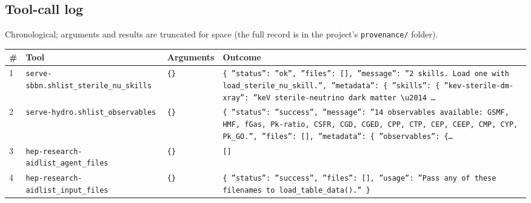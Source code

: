\documentclass[11pt,a4paper]{article}
\begin{document}
\subsection{Tool-call log}
Chronological; arguments and results are truncated for space (the full record is in the project's \texttt{provenance/} folder).
\begin{longtable}{@{}p{}p{}p{}p{}@{}}
\toprule \# & Tool & Arguments & Outcome \\ \midrule \endhead
1 & \texttt{serve-sbbn.sh}\newline\texttt{list\_\allowbreak{}sterile\_\allowbreak{}nu\_\allowbreak{}skills} & \texttt{\{\}\allowbreak{}} & \texttt{\{   ''status'':\allowbreak{} ''ok'',\allowbreak{}   ''files'':\allowbreak{} []\allowbreak{},\allowbreak{}   ''message'':\allowbreak{} ''2 skills. Load one with load\_\allowbreak{}sterile\_\allowbreak{}nu\_\allowbreak{}skill.'',\allowbreak{}   ''metadata'':\allowbreak{} \{     ''skills'':\allowbreak{} \{       ''kev-sterile-dm-xray'':\allowbreak{} ''keV sterile-neutrino dark matter \textbackslash{}\allowbreak{}u2014 \ldots{}\allowbreak{}} \\
2 & \texttt{serve-hydro.sh}\newline\texttt{list\_\allowbreak{}observables} & \texttt{\{\}\allowbreak{}} & \texttt{\{   ''status'':\allowbreak{} ''success'',\allowbreak{}   ''message'':\allowbreak{} ''14 observables available:\allowbreak{} GSMF,\allowbreak{} HMF,\allowbreak{} fGas,\allowbreak{} Pk-ratio,\allowbreak{} CSFR,\allowbreak{} CGD,\allowbreak{} CGED,\allowbreak{} CPP,\allowbreak{} CTP,\allowbreak{} CEP,\allowbreak{} CEEP,\allowbreak{} CMP,\allowbreak{} CYP,\allowbreak{} Pk\_\allowbreak{}GO.'',\allowbreak{}   ''files'':\allowbreak{} []\allowbreak{},\allowbreak{}   ''metadata'':\allowbreak{} \{     ''observables'':\allowbreak{} \{\ldots{}\allowbreak{}} \\
3 & \texttt{hep-research-aid}\newline\texttt{list\_\allowbreak{}agent\_\allowbreak{}files} & \texttt{\{\}\allowbreak{}} & \texttt{[]\allowbreak{}} \\
4 & \texttt{hep-research-aid}\newline\texttt{list\_\allowbreak{}input\_\allowbreak{}files} & \texttt{\{\}\allowbreak{}} & \texttt{\{   ''status'':\allowbreak{} ''success'',\allowbreak{}   ''files'':\allowbreak{} []\allowbreak{},\allowbreak{}   ''usage'':\allowbreak{} ''Pass any of these filenames to load\_\allowbreak{}table\_\allowbreak{}data()\allowbreak{}.'' \}\allowbreak{}} \\

\end{longtable}
\end{document}
